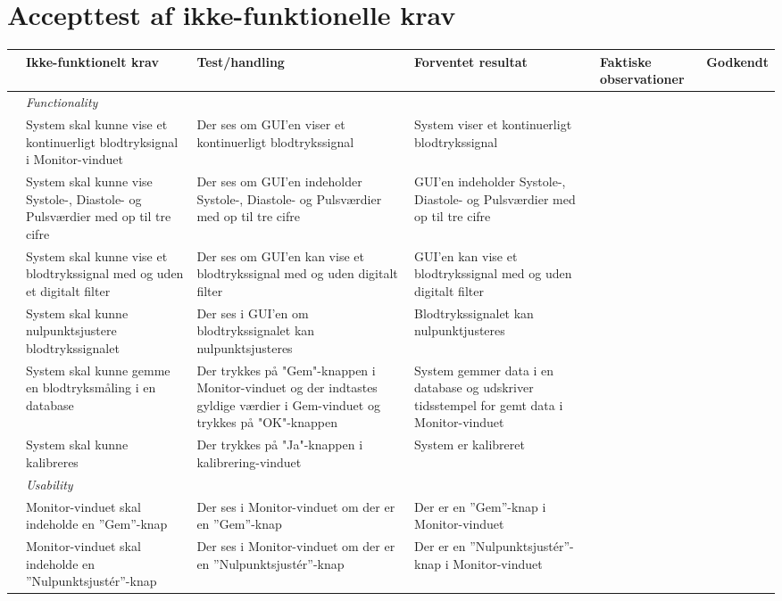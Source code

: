 \section{Accepttest af ikke-funktionelle krav}

\begin{longtabu} to 
	& Ikke-funktionelt krav & Test/handling & Forventet resultat & Faktiske observationer & Godkendt
	\\[-1ex] \midrule
	&  \textit{Functionality} &  &  & & \\ \midrule
	& System skal kunne vise et kontinuerligt blodtryksignal i Monitor-vinduet & Der ses om GUI'en viser et kontinuerligt blodtrykssignal & System viser et kontinuerligt blodtrykssignal &  & %
	\\ \midrule
	& System skal kunne vise Systole-, Diastole- og Pulsværdier med op til tre cifre & Der ses om GUI'en indeholder Systole-, Diastole- og Pulsværdier med op til tre cifre & GUI'en indeholder Systole-, Diastole- og Pulsværdier med op til tre cifre &  & %
	\\ \midrule
	& System skal kunne vise et blodtrykssignal med og uden et digitalt filter & Der ses om GUI'en kan vise et blodtrykssignal med og uden digitalt filter & GUI'en kan vise et blodtrykssignal med og uden digitalt filter &  & %
	\\ \midrule
	& System skal kunne nulpunktsjustere blodtrykssignalet & Der ses i GUI'en om blodtrykssignalet kan nulpunktsjusteres & Blodtrykssignalet kan nulpunktjusteres &  & %
	\\ \midrule
	& System skal kunne gemme en blodtryksmåling i en database & Der trykkes på "Gem"\--knappen i Monitor-vinduet og der indtastes gyldige værdier i Gem-vinduet og trykkes på "OK"\--knappen & System gemmer data i en database og udskriver tidsstempel for gemt data i Monitor-vinduet &  & %
	\\ \midrule
	& System skal kunne kalibreres & Der trykkes på "Ja"\--knappen i kalibrering-vinduet & System er kalibreret &  & %
	\\ \midrule
	& \textit{Usability} &  &  & & \\ \midrule
	& Monitor-vinduet skal indeholde en ”Gem”\--knap & Der ses i Monitor-vinduet om der er en ”Gem”\--knap & Der er en ”Gem”\--knap i Monitor-vinduet &  & %
	\\ \midrule
	& Monitor-vinduet skal indeholde en ”Nulpunktsjustér”\--knap & Der ses i Monitor-vinduet om der er en ”Nulpunktsjustér”\--knap & Der er en ”Nulpunktsjustér”\--knap i Monitor-vinduet &  & %

\end{longtabu}
